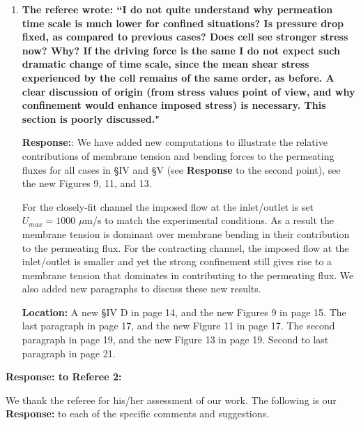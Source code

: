 \documentclass[12pt]{article}
\begin{document}
\begin{enumerate}
\item{\bf
The referee wrote:
``I do not quite understand why permeation time scale is much lower
for confined situations? Is pressure drop fixed, as compared to
previous cases? Does cell see stronger stress now? Why? If the driving
force is the same I do not expect such dramatic change of time scale,
since the mean shear stress experienced by the cell remains of the
same order, as before. A clear discussion of origin (from stress
values point of view, and why confinement would enhance imposed
stress) is necessary. This section is poorly discussed."}

\noindent
{\bf Response:}:  We have added new computations to illustrate the relative contributions of membrane tension and bending forces to the permeating fluxes for all cases in \S IV and \S V (see {\bf Response} to the second point), see the new Figures 9, 11, and 13.

For the closely-fit channel the imposed flow at the inlet/outlet is set $U_{max}=1000$ $\mu$m/s to match the experimental conditions. As a result the membrane tension is dominant over membrane bending in their contribution to the permeating flux. For the contracting channel, the imposed flow at the inlet/outlet is smaller and yet the strong confinement still gives rise to a membrane tension that dominates in contributing to the permeating flux. We also added new paragraphs to discuss these new results.

\noindent
{\bf Location:} A new \S IV D in page 14, and the new Figures 9 in page 15. The last paragraph in page 17, and the new Figure 11 in page 17. The second paragraph in page 19, and the new Figure 13 in page 19. Second to last paragraph in page 21.

\end{enumerate}

\newpage
\vspace{0.5cm}
{\large \bf {\bf Response:} to Referee 2:}
\vspace{0.5cm}

We thank the referee for his/her assessment of our work.  
The following is
our {\bf Response:} to each of the specific comments and suggestions.
\end{document}
